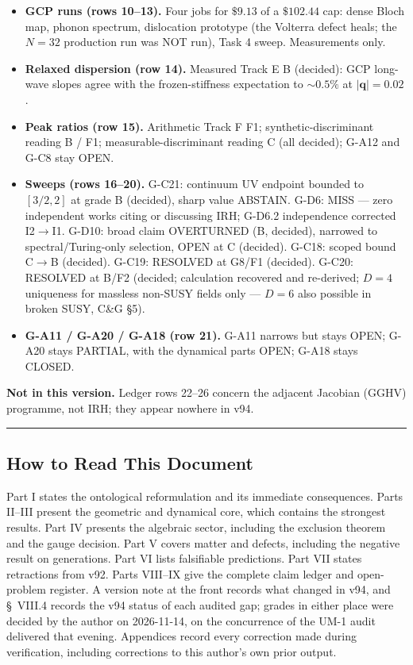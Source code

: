 \documentclass[a4paper,11pt]{article}
\begin{document}
\begin{itemize}
\item \textbf{GCP runs (rows 10--13).} Four jobs for $\$9.13$ of a $\$102.44$ cap: dense Bloch map, phonon spectrum, dislocation prototype (the Volterra defect heals; the $N=32$ production run was NOT run), Task 4 sweep. Measurements only.
\item \textbf{Relaxed dispersion (row 14).} Measured Track E B (decided): GCP long-wave slopes agree with the frozen-stiffness expectation to $\sim0.5\%$ at $|\mathbf{q}|=0.02$.
\item \textbf{Peak ratios (row 15).} Arithmetic Track F F1; synthetic-discriminant reading B / F1; measurable-discriminant reading C (all decided); G-A12 and G-C8 stay OPEN.
\item \textbf{Sweeps (rows 16--20).} G-C21: continuum UV endpoint bounded to $[3/2,2]$ at grade B (decided), sharp value ABSTAIN. G-D6: MISS --- zero independent works citing or discussing IRH; G-D6.2 independence corrected I2$\to$I1. G-D10: broad claim OVERTURNED (B, decided), narrowed to spectral/Turing-only selection, OPEN at C (decided). G-C18: scoped bound C$\to$B (decided). G-C19: RESOLVED at G8/F1 (decided). G-C20: RESOLVED at B/F2 (decided; calculation recovered and re-derived; $D=4$ uniqueness for massless non-SUSY fields only --- $D=6$ also possible in broken SUSY, C\&G \S5).
\item \textbf{G-A11 / G-A20 / G-A18 (row 21).} G-A11 narrows but stays OPEN; G-A20 stays PARTIAL, with the dynamical parts OPEN; G-A18 stays CLOSED.
\end{itemize}

\textbf{Not in this version.} Ledger rows 22--26 concern the adjacent Jacobian (GGHV) programme, not IRH; they appear nowhere in v94.

\medskip\hrule\medskip

\subsection*{How to Read This Document}

Part I states the ontological reformulation and its immediate consequences. Parts II–III present the geometric and dynamical core, which contains the strongest results. Part IV presents the algebraic sector, including the exclusion theorem and the gauge decision. Part V covers matter and defects, including the negative result on generations. Part VI lists falsifiable predictions. Part VII states retractions from v92. Parts VIII–IX give the complete claim ledger and open-problem register. A version note at the front records what changed in v94, and \S~VIII.4 records the v94 status of each audited gap; grades in either place were decided by the author on 2026-11-14, on the concurrence of the UM-1 audit delivered that evening. Appendices record every correction made during verification, including corrections to this author's own prior output.
\end{document}
